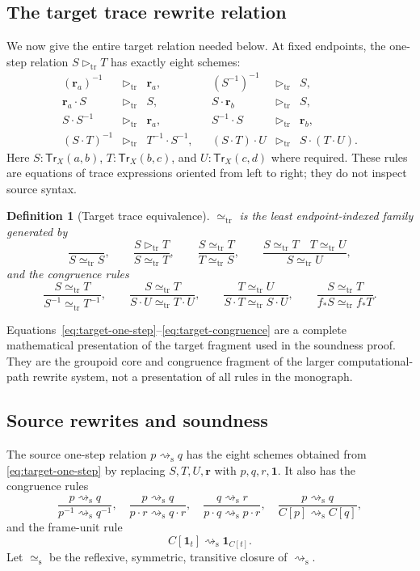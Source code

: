 \documentclass[10pt,reqno]{amsart}
\newtheorem{definition}[theorem]{Definition}
\newcommand{\Tr}{\mathsf{Tr}}
\newcommand{\TrStep}{\mathrel{\triangleright_{\mathrm{tr}}}}
\newcommand{\TrEq}{\mathrel{\simeq_{\mathrm{tr}}}}
\newcommand{\srw}{\mathrel{\rightsquigarrow_{\mathrm s}}}
\newcommand{\srweq}{\mathrel{\simeq_{\mathrm s}}}
\begin{document}
\subsection{The target trace rewrite relation}

We now give the entire target relation needed below.  At fixed endpoints,
the one-step relation \(S\TrStep T\) has exactly eight schemes:
\[
\begin{array}{rclcrcl}
(\mathbf r_a)^{-1}&\TrStep&\mathbf r_a,
&& (S^{-1})^{-1}&\TrStep&S,\\
\mathbf r_a\cdot S&\TrStep&S,
&&S\cdot\mathbf r_b&\TrStep&S,\\
S\cdot S^{-1}&\TrStep&\mathbf r_a,
&&S^{-1}\cdot S&\TrStep&\mathbf r_b,\\
(S\cdot T)^{-1}&\TrStep&T^{-1}\cdot S^{-1},
&&(S\cdot T)\cdot U&\TrStep&S\cdot(T\cdot U).
\end{array}
\tag{8.11}\label{eq:target-one-step}
\]
Here \(S:\Tr_X(a,b)\), \(T:\Tr_X(b,c)\), and
\(U:\Tr_X(c,d)\) where required.  These rules are equations of trace
expressions oriented from left to right; they do not inspect source syntax.

\begin{definition}[Target trace equivalence]
\label{def:target-trace-equivalence}
\(\TrEq\) is the least endpoint-indexed family generated by
\[
\frac{}{S\TrEq S},\qquad
\frac{S\TrStep T}{S\TrEq T},\qquad
\frac{S\TrEq T}{T\TrEq S},\qquad
\frac{S\TrEq T\quad T\TrEq U}{S\TrEq U},
\tag{8.12}\label{eq:target-equivalence-closure}
\]
and the congruence rules
\[
\frac{S\TrEq T}{S^{-1}\TrEq T^{-1}},\qquad
\frac{S\TrEq T}{S\cdot U\TrEq T\cdot U},\qquad
\frac{T\TrEq U}{S\cdot T\TrEq S\cdot U},\qquad
\frac{S\TrEq T}{f_\ast S\TrEq f_\ast T}.
\tag{8.13}\label{eq:target-congruence}
\]
\end{definition}

Equations~\eqref{eq:target-one-step}--\eqref{eq:target-congruence} are a
complete mathematical presentation of the target fragment used in the
soundness proof.  They are the groupoid core and congruence fragment of the
larger computational-path rewrite system, not a presentation of all rules in
the monograph.

\subsection{Source rewrites and soundness}

The source one-step relation \(p\srw q\) has the eight schemes obtained from
\eqref{eq:target-one-step} by replacing \(S,T,U,\mathbf r\) with
\(p,q,r,\mathbf1\).  It also has the congruence rules
\[
\frac{p\srw q}{p^{-1}\srw q^{-1}},\quad
\frac{p\srw q}{p\cdot r\srw q\cdot r},\quad
\frac{q\srw r}{p\cdot q\srw p\cdot r},\quad
\frac{p\srw q}{C[p]\srw C[q]},
\tag{8.14}\label{eq:source-congruence-rules}
\]
and the frame-unit rule
\[
                  C[\mathbf1_t]\srw\mathbf1_{C[t]}.
\tag{8.15}\label{eq:frame-unit}
\]
Let \(\srweq\) be the reflexive, symmetric, transitive closure of
\(\srw\).
\end{document}
